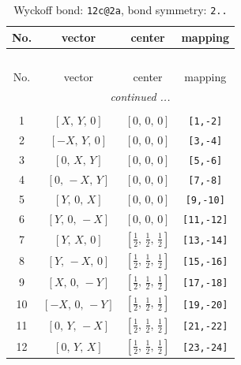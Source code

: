 \documentclass[fleqn,8pt]{jsarticle}
\begin{document}
\begin{longtable}{cccc}
\caption{Wyckoff bond: {\tt 12c@2a}, bond symmetry: {\tt 2..}}
 \\
 \hline \hline
No. & vector & center & mapping \\ \hline \endfirsthead

\multicolumn{3}{l}{\tablename\ \thetable{}} \\
 \hline \hline
No. & vector & center & mapping \\ \hline \endhead

 \hline \hline
\multicolumn{3}{r}{\footnotesize\it continued ...} \\ \endfoot

 \hline \hline
\multicolumn{3}{r}{} \\ \endlastfoot

1 & $\left[ X,\, Y,\, 0 \right]$ & $\left[ 0,\, 0,\, 0 \right]$ & {\tt [1,-2]} \\ \hline
2 & $\left[ - X,\, Y,\, 0 \right]$ & $\left[ 0,\, 0,\, 0 \right]$ & {\tt [3,-4]} \\ \hline
3 & $\left[ 0,\, X,\, Y \right]$ & $\left[ 0,\, 0,\, 0 \right]$ & {\tt [5,-6]} \\ \hline
4 & $\left[ 0,\, - X,\, Y \right]$ & $\left[ 0,\, 0,\, 0 \right]$ & {\tt [7,-8]} \\ \hline
5 & $\left[ Y,\, 0,\, X \right]$ & $\left[ 0,\, 0,\, 0 \right]$ & {\tt [9,-10]} \\ \hline
6 & $\left[ Y,\, 0,\, - X \right]$ & $\left[ 0,\, 0,\, 0 \right]$ & {\tt [11,-12]} \\ \hline
7 & $\left[ Y,\, X,\, 0 \right]$ & $\left[ \frac{1}{2},\, \frac{1}{2},\, \frac{1}{2} \right]$ & {\tt [13,-14]} \\ \hline
8 & $\left[ Y,\, - X,\, 0 \right]$ & $\left[ \frac{1}{2},\, \frac{1}{2},\, \frac{1}{2} \right]$ & {\tt [15,-16]} \\ \hline
9 & $\left[ X,\, 0,\, - Y \right]$ & $\left[ \frac{1}{2},\, \frac{1}{2},\, \frac{1}{2} \right]$ & {\tt [17,-18]} \\ \hline
10 & $\left[ - X,\, 0,\, - Y \right]$ & $\left[ \frac{1}{2},\, \frac{1}{2},\, \frac{1}{2} \right]$ & {\tt [19,-20]} \\ \hline
11 & $\left[ 0,\, Y,\, - X \right]$ & $\left[ \frac{1}{2},\, \frac{1}{2},\, \frac{1}{2} \right]$ & {\tt [21,-22]} \\ \hline
12 & $\left[ 0,\, Y,\, X \right]$ & $\left[ \frac{1}{2},\, \frac{1}{2},\, \frac{1}{2} \right]$ & {\tt [23,-24]} \\
\end{longtable}
\end{document}
